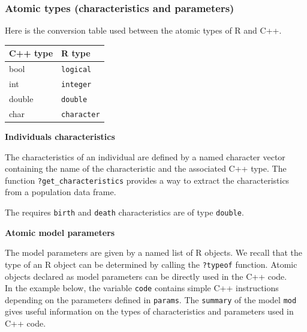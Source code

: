 \hypertarget{atomic-types-characteristics-and-parameters}{%
\subsubsection{Atomic types (characteristics and parameters)}\label{atomic-types-characteristics-and-parameters}}

Here is the conversion table used between the atomic types of R and C++.

\begin{longtable}[]{@{}ll@{}}
\toprule
C++ type & R type\tabularnewline
\midrule
\endhead
bool & \texttt{logical}\tabularnewline
int & \texttt{integer}\tabularnewline
double & \texttt{double}\tabularnewline
char & \texttt{character}\tabularnewline
\bottomrule
\end{longtable}

\textbf{Individuals characteristics}

The characteristics of an individual are defined by a named character vector containing the name of the characteristic and the associated C++ type. The function \texttt{?get\_characteristics} provides a way to extract the characteristics from a population data frame.

\begin{Shaded}
\begin{Highlighting}[]
\StringTok{ }\OperatorTok{::}\OperatorTok{$}
\end{Highlighting}
\end{Shaded}

The requires \texttt{birth} and \texttt{death} characteristics are of type \texttt{double}.

\textbf{Atomic model parameters}

The model parameters are given by a named list of R objects. We recall that the type of an R object can be determined by calling the \texttt{?typeof} function. Atomic objects declared as model parameters can be directly used in the C++ code.\\
In the example below, the variable \texttt{code} contains simple C++ instructions depending on the parameters defined in \texttt{params}. The \texttt{summary} of the model \texttt{mod} gives useful information on the types of characteristics and parameters used in C++ code.

